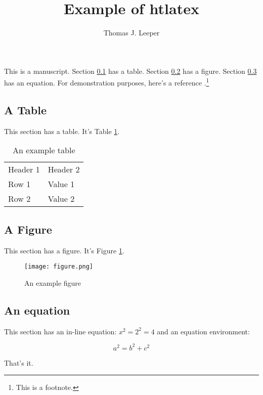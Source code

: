 \documentclass{article}
\title{Example of htlatex}
\author{Thomas J. Leeper}
\begin{document}
\maketitle

\noindent This is a manuscript. Section \ref{sec:table} has a table. Section \ref{sec:figure} has a figure. Section \ref{sec:eq} has an equation. For demonstration purposes, here's a reference \citep{Grovesetal2006}.\footnote{This is a footnote.}

\subsection{A Table}\label{sec:table}

This section has a table. It's Table \ref{tab:table1}.

\begin{table}[ht]
\caption{An example table}\label{tab:table1}
\begin{tabular}{ll}
Header 1 & Header 2\\
Row 1 & Value 1 \\
Row 2 & Value 2 \\
\end{tabular}
\end{table}

\subsection{A Figure}\label{sec:figure}

This section has a figure. It's Figure \ref{fig:fig1}.

\begin{figure}[ht]
\caption{An example figure}\label{fig:fig1}
\texttt{[image: figure.png]}
\end{figure}

\subsection{An equation}\label{sec:eq}

This section has an in-line equation: $x^2 = 2^2 = 4$ and an equation environment:

\begin{equation}
a^2 = b^2 + c^2
\end{equation}

\noindent That's it.



\end{document}
